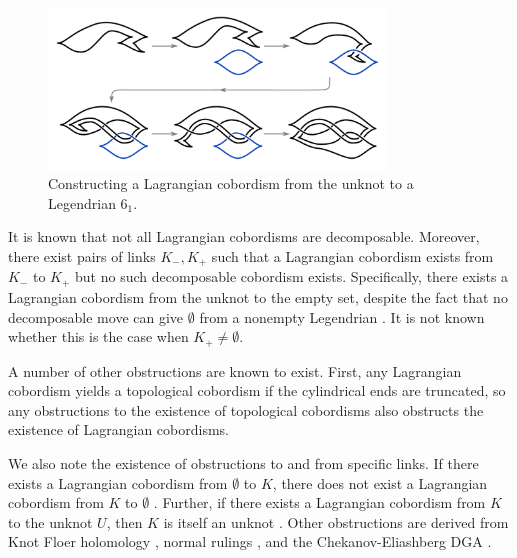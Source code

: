 \begin{figure}[ht!]
    \centering
    \includegraphics[width=0.8\textwidth]{images/cobordism-movie--1.pdf}
    \caption{Constructing a Lagrangian cobordism from the unknot to a Legendrian $6_1$.}
    \label{fig:cobordism-construction}
\end{figure}

It is known that not all Lagrangian cobordisms are decomposable. Moreover, there exist pairs of links $K_-, K_+$ such that a Lagrangian cobordism exists from $K_-$ to $K_+$ but no such decomposable cobordism exists. Specifically, there exists a Lagrangian cobordism from the unknot to the empty set, despite the fact that no decomposable move can give $\emptyset$ from a nonempty Legendrian \cite{lin}. It is not known whether this is the case when $K_+ \neq \emptyset$.

A number of other obstructions are known to exist.
First, any Lagrangian cobordism yields a topological cobordism if the cylindrical ends are truncated, so any obstructions to the existence of topological cobordisms also obstructs the existence of Lagrangian cobordisms.

We also note the existence of obstructions to and from specific links. If there exists a Lagrangian cobordism from $\emptyset$ to $K$, there does not exist a Lagrangian cobordism from $K$ to $\emptyset$ \cite{gromov}. Further, if there exists a Lagrangian cobordism from $K$ to the unknot $U$, then $K$ is itself an unknot \cite{cornwell}.
Other obstructions are derived from Knot Floer holomology \cite{baldwin}, normal rulings \cite{cornwell}, and the Chekanov-Eliashberg DGA \cite{pan}. 



